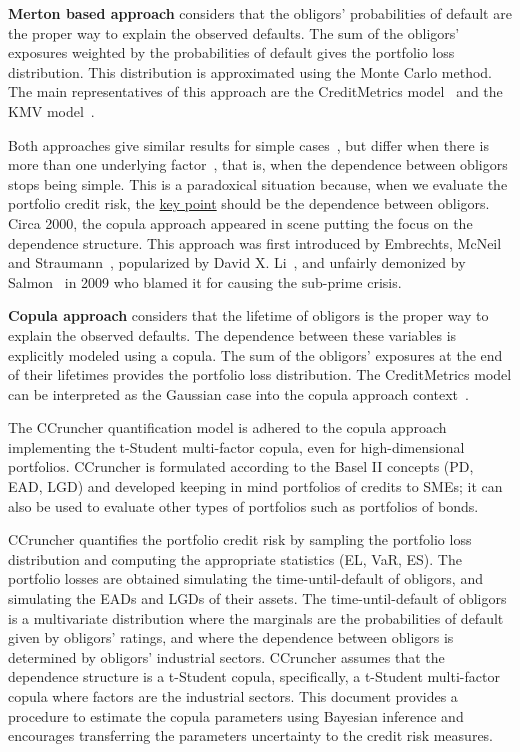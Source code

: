 \documentclass[11pt,fleqn]{book} %
\begin{document}
\textbf{Merton based approach} considers that the obligors' 
probabilities of default are the proper way to explain the observed defaults.
The sum of the obligors' exposures weighted by the probabilities of default 
gives the portfolio loss distribution. This distribution is approximated 
using the Monte Carlo method. The main representatives of this approach are the 
CreditMetrics\texttrademark{} model~\cite{cmetrics:1997} and the KMV 
model~\cite{kmv:2003}. 

Both approaches give similar results for simple cases~\cite{koyluoglu:1998},
but differ when there is more than one underlying factor~\cite{bluhm:2001}, 
that is, when the dependence between obligors stops being simple.
This is a paradoxical situation because, when we evaluate the portfolio credit 
risk, the \underline{key point} should be the dependence between obligors. 
Circa 2000, the copula approach appeared in scene putting the focus on the 
dependence structure. This approach was first introduced by Embrechts, McNeil 
and Straumann~\cite{embrechts:2002}, popularized by David X. Li~\cite{li:2000}, 
and unfairly demonized by Salmon~\cite{salmon:2009} in 2009 who blamed it for 
causing the sub-prime crisis.

\textbf{Copula approach} considers that the lifetime of obligors is
the proper way to explain the observed defaults. The dependence between 
these variables is explicitly modeled using a copula. The sum of the obligors' 
exposures at the end of their lifetimes provides the portfolio loss 
distribution. The CreditMetrics\texttrademark{} model can be interpreted as 
the Gaussian case into the copula approach context~\cite{li:2000}.

The CCruncher quantification model is adhered to the copula approach 
implementing the t-Student multi-factor copula, even for high-dimensional 
portfolios. CCruncher is formulated according to the Basel II concepts 
(PD, EAD, LGD) and developed keeping in mind portfolios of credits to SMEs;
it can also be used to evaluate other types of portfolios such as portfolios 
of bonds.

CCruncher quantifies the portfolio credit risk by sampling the portfolio loss
distribution and computing the appropriate statistics (EL, VaR, ES). The 
portfolio losses are obtained simulating the time-until-default of obligors, 
and simulating the EADs and LGDs of their assets. The time-until-default of 
obligors is a multivariate distribution where the marginals are the 
probabilities of default given by obligors' ratings, and where the dependence 
between obligors is determined by obligors' industrial sectors. CCruncher 
assumes that the dependence structure is a t-Student copula, specifically, 
a t-Student multi-factor copula where factors are the industrial sectors.
This document provides a procedure to estimate the copula parameters using
Bayesian inference and encourages transferring the parameters uncertainty
to the credit risk measures.
\end{document}
